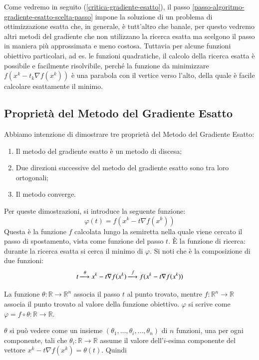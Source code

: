 Come vedremo in seguito (\ref{critica-gradiente-esatto}), il passo
\ref{passo-algoritmo-gradiente-esatto-scelta-passo} impone la
soluzione di un problema di ottimizzazione esatta che, in generale, \`e
tutt'altro che banale, per questo vedremo altri metodi del gradiente
che non utilizzano la ricerca esatta ma scelgono il passo in maniera
pi\`u approssimata e meno costosa. Tuttavia per alcune funzioni
obiettivo particolari, ad es. le funzioni quadratiche, il calcolo
della ricerca esatta \`e possibile e facilmente risolvibile, perch\'e la
funzione da minimizzare $f(x^{k} - t_k \nabla f(x^{k}))$ \`e una
parabola con il vertice verso l'alto, della quale \`e facile calcolare
esattamente il minimo.

\subsection{Propriet\`a del Metodo del Gradiente Esatto} Abbiamo
intenzione di dimostrare tre propriet\`a del Metodo del Gradiente
Esatto:
\begin{enumerate}
\item Il metodo del gradiente esatto \`e un metodo di discesa;
\item Due direzioni successive del metodo del gradiente esatto sono
tra loro ortogonali;
\item Il metodo converge.
\end{enumerate}

Per queste dimostrazioni, si introduce la seguente funzione:
$$\varphi(t) = f(x^{k} - t \nabla f(x^{k}))$$
Questa \`e la funzione $f$ calcolata lungo la semiretta nella quale
viene cercato il passo di spostamento, vista come funzione del passo
$t$. \`E la funzione di ricerca: durante la ricerca esatta si cerca il
minimo di $\varphi$. Si noti che \`e la composizione di due funzioni:
$$ t \xlongrightarrow{\theta} x^{k}-t\nabla f(x^{k}) \xlongrightarrow{f} f(x^{k} - t \nabla f(x^{k}))$$

La funzione $\theta: \mathbb{R} \rightarrow \mathbb{R}^{n}$ associa il
passo $t$ al punto trovato, mentre $f: \mathbb{R}^{n} \rightarrow
\mathbb{R}$ associa il punto trovato al valore della funzione
obiettivo. $\varphi$ si scrive come $ \varphi= f \circ \theta :
\mathbb{R} \rightarrow \mathbb{R}$.

$\theta$ si può vedere come un insieme $(\theta_{1}, \ldots,
\theta_{i}, \ldots, \theta_{n})$ di $n$ funzioni, una per ogni
componente, tali che $\theta_{i}: \mathbb{R} \rightarrow \mathbb{R}$
assume il valore dell'$i$-esima componente del vettore $x^{k}-t\nabla
f(x^{k}) = \theta(t)$. Quindi

